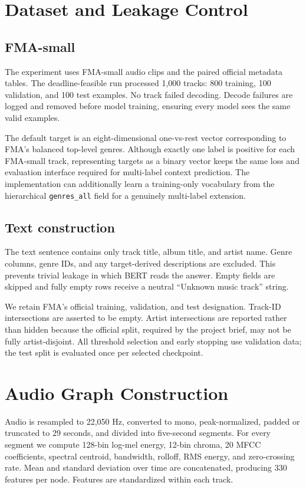 \IfFileExists{IEEEtran.cls}{\usingieeetrue\documentclass[conference]{IEEEtran}}{\usingieeefalse\documentclass[10pt,twocolumn]{article}}
\begin{document}
\section{Dataset and Leakage Control}
\subsection{FMA-small}
The experiment uses FMA-small audio clips and the paired official metadata tables. The deadline-feasible run processed 1,000 tracks: 800 training, 100 validation, and 100 test examples. No track failed decoding. Decode failures are logged and removed before model training, ensuring every model sees the same valid examples.

The default target is an eight-dimensional one-vs-rest vector corresponding to FMA's balanced top-level genres. Although exactly one label is positive for each FMA-small track, representing targets as a binary vector keeps the same loss and evaluation interface required for multi-label context prediction. The implementation can additionally learn a training-only vocabulary from the hierarchical \texttt{genres\_all} field for a genuinely multi-label extension.

\subsection{Text construction}
The text sentence contains only track title, album title, and artist name. Genre columns, genre IDs, and any target-derived descriptions are excluded. This prevents trivial leakage in which BERT reads the answer. Empty fields are skipped and fully empty rows receive a neutral ``Unknown music track'' string.

We retain FMA's official training, validation, and test designation. Track-ID intersections are asserted to be empty. Artist intersections are reported rather than hidden because the official split, required by the project brief, may not be fully artist-disjoint. All threshold selection and early stopping use validation data; the test split is evaluated once per selected checkpoint.

\section{Audio Graph Construction}
Audio is resampled to 22,050 Hz, converted to mono, peak-normalized, padded or truncated to 29 seconds, and divided into five-second segments. For every segment we compute 128-bin log-mel energy, 12-bin chroma, 20 MFCC coefficients, spectral centroid, bandwidth, rolloff, RMS energy, and zero-crossing rate. Mean and standard deviation over time are concatenated, producing 330 features per node. Features are standardized within each track.
\end{document}
